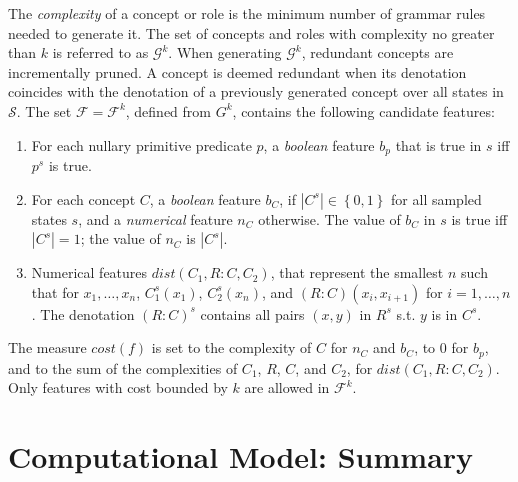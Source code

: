 \documentclass[letterpaper]{article} %
\newcommand{\set}[1]{\ensuremath{\left\{#1 \right\}}}
\newcommand{\F}{\mathcal{F}}
\renewcommand{\S}{\mathcal{S}}
\newcommand{\G}{\mathcal{G}}
\begin{document}
The \emph{complexity} of a concept or role is the minimum number of grammar  rules needed to generate it.
The set of concepts and roles with complexity no greater than  $k$ is referred to as  $\G^k$.
When generating  $\G^k$,  redundant  concepts are incrementally pruned. A concept is deemed
redundant when its  denotation coincides with the denotation of a previously generated concept 
over all  states in $\S$.  The set $\F=\F^k$, defined from $G^k$, contains the following candidate features:
\begin{enumerate}[{\small$\bullet$}]
\item For each nullary primitive predicate $p$, a \emph{boolean} feature $b_p$ that is true in $s$ iff $p^s$ is true.

\item For each concept $C$, 
a \emph{boolean} feature $b_C$, if $|C^s| \in \set{0,1}$ for all sampled states $s$, 
and a \emph{numerical} feature $n_C$ otherwise. The value of $b_C$ in $s$ is true iff $|C^s| = 1$;
the value of $n_C$ is $|C^s|$.

\item Numerical features $\textit{dist}(C_1,R{:}C,C_2)$, that represent the smallest
  $n$ such that for $x_1, \ldots, x_n$, $C_1^s(x_1)$, $C_2^s(x_{n})$, and
  $(R{:}C)(x_i,x_{i+1})$ for $i=1, \ldots, n$. The denotation $(R{:}C)^s$ 
  contains all pairs $(x,y)$ in $R^s$ s.t. $y$ is in $C^s$.
\end{enumerate}  

The measure $cost(f)$ is set to the complexity of $C$ for $n_C$ and $b_C$,
to $0$ for $b_p$,  and to the sum of the complexities of $C_1$, $R$, $C$, and $C_2$, for $\textit{dist}(C_1,R{:}C,C_2)$.
Only features with cost bounded by $k$ are allowed in $\F^k$.

\section{Computational Model: Summary}
\end{document}
